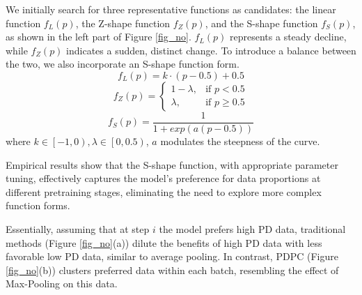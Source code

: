 \documentclass[11pt]{article}
\begin{document}
We initially search for three representative functions as candidates: the linear function $f_{L}(p)$, the Z-shape function $f_{Z}(p)$, and the S-shape function $f_{S}(p)$, as shown in the left part of Figure \ref{fig_no}. $f_{L}(p)$ represents a steady decline, while $f_{Z}(p)$ indicates a sudden, distinct change. To introduce a balance between the two, we also incorporate an S-shape function form.
\begin{equation}
   f_{L}(p) = k \cdot (p - 0.5) + 0.5
   \label{eq:linear}
\end{equation}  
\begin{equation}
   f_{Z}(p) = 
\begin{cases} 
1 - \lambda, & \text{if } p < 0.5 \\
\lambda, & \text{if } p \geq 0.5 
\end{cases}
\label{eq:step}
\end{equation}
\begin{equation}
       f_{S}(p) = \frac{1}{1 + exp{(a(p - 0.5))}}
       \label{eq:sigmoid}
\end{equation}
where $k \in \left[-1,0\right), \lambda \in \left[0, 0.5\right)$, \( a \) modulates the steepness of the curve.

Empirical results show that the S-shape function, with appropriate parameter tuning, effectively captures the model's preference for data proportions at different pretraining stages, eliminating the need to explore more complex function forms. 



Essentially, assuming that at step \(i\) the model prefers high PD data, traditional methods (Figure \ref{fig_no}(a)) dilute the benefits of high PD data with less favorable low PD data, similar to average pooling. In contrast, PDPC (Figure \ref{fig_no}(b)) clusters preferred data within each batch, resembling the effect of Max-Pooling on this data.

\end{document}

